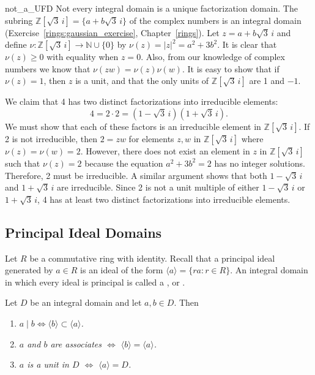 \begin{example}{not_a_UFD}
Not every integral domain is a unique factorization domain. The
subring ${\mathbb Z}[ \sqrt{3}\, i ] = \{ a + b \sqrt{3}\, i\}$ of the
complex numbers is an integral domain (Exercise~\ref{rings:gaussian_exercise}, Chapter~\ref{rings}). Let
$z = a + b \sqrt{3}\, i$ and define \mbox{$\nu : {\mathbb Z}[ \sqrt{3}\, i ]
\rightarrow {\mathbb N} \cup \{ 0 \}$} by $\nu( z) = |z|^2 = a^2 + 3 b^2$.
It is clear that $\nu(z) \geq 0$ with equality when $z = 0$. Also,
from our knowledge of complex numbers we know that $\nu(z w) = \nu(z)
\nu(w)$. It is easy to show that if $\nu(z) = 1$, then $z$ is a unit,
and that the only units of ${\mathbb Z}[ \sqrt{3}\, i ]$ are 1 and $-1$.   
 

We claim that 4 has two distinct factorizations into irreducible
elements: 
\[
4 = 2 \cdot 2 = (1 - \sqrt{3}\, i) (1 + \sqrt{3}\, i).
\]
We must show that each of these factors is an irreducible element in
${\mathbb Z}[ \sqrt{3}\, i ]$. If 2 is not irreducible, then $2 = z w$ for
elements $z, w$ in ${\mathbb Z}[ \sqrt{3}\, i ]$ where $\nu( z) = \nu(w) =
2$. However, there does not exist an element in $z$ in ${\mathbb
Z}[\sqrt{3}\, i ]$ such that $\nu(z) = 2$ because the equation $a^2 + 3
b^2 = 2$ has no integer solutions. Therefore, 2 must be irreducible. A
similar argument shows that both $1 - \sqrt{3}\, i$ and $1 + \sqrt{3}\, i$
are irreducible. Since 2 is not a unit multiple of either $1 - 
\sqrt{3}\, i$ or $1 + \sqrt{3}\, i$, 4 has at least two distinct
factorizations into irreducible elements.
\mbox{\hspace{1in}}
\end{example}
 

 
\subsection*{Principal Ideal Domains}
 

Let $R$ be a commutative ring with identity. Recall that a principal
ideal generated by $a \in R$ is an ideal of the form $\langle a
\rangle = \{ ra : r \in R \}$. An integral domain in which every ideal
is principal is called a , or  . 
 

\begin{lemma}\label{domains:PI_lemma}
Let $D$ be an integral domain and let $a, b \in D$.
Then  
\begin{enumerate}

\rm\item\it
$a \mid b \Leftrightarrow \langle b \rangle \subset \langle a
\rangle$. 

\rm\item\it
$a$ and $b$ are associates $\Leftrightarrow$ $\langle b \rangle =
\langle a \rangle$.

\rm\item\it
$a$ is a unit in $D$ $\Leftrightarrow$ $\langle a \rangle = D$.

\end{enumerate} 
\end{lemma}



